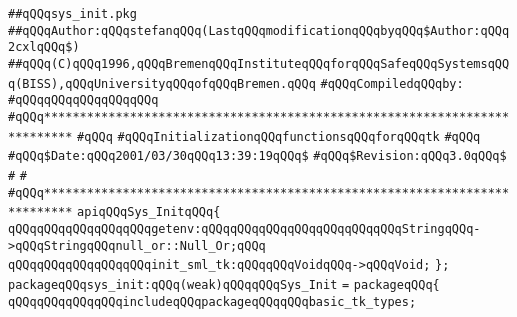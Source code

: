 \label{src/lib/tk/src/sys_init.pkg}
\verb|##qQQqsys_init.pkg|\newline
\verb|##qQQqAuthor:qQQqstefanqQQq(LastqQQqmodificationqQQqbyqQQq$Author:qQQq2cxlqQQq$)|\newline
\verb|##qQQq(C)qQQq1996,qQQqBremenqQQqInstituteqQQqforqQQqSafeqQQqSystemsqQQq(BISS),qQQqUniversityqQQqofqQQqBremen.qQQq|\newline
\newline
\verb|#qQQqCompiledqQQqby:|\newline
\verb|#qQQqqQQqqQQqqQQqqQQq|\newline
\newline
\newline
\verb|#qQQq**************************************************************************|\newline
\verb|#qQQq|\newline
\verb|#qQQqInitializationqQQqfunctionsqQQqforqQQqtk|\newline
\verb|#qQQq|\newline
\verb|#qQQq$Date:qQQq2001/03/30qQQq13:39:19qQQq$|\newline
\verb|#qQQq$Revision:qQQq3.0qQQq$|\newline
\verb|#|\newline
\verb|#|\newline
\verb|#qQQq**************************************************************************|\newline
\newline
\newline
\newline
\verb|apiqQQqSys_InitqQQq{|\newline
\newline
\verb|qQQqqQQqqQQqqQQqqQQqgetenv:qQQqqQQqqQQqqQQqqQQqqQQqqQQqStringqQQq->qQQqStringqQQqnull_or::Null_Or;qQQq|\newline
\verb|qQQqqQQqqQQqqQQqqQQqinit_sml_tk:qQQqqQQqVoidqQQq->qQQqVoid;|\newline
\verb|};|\newline
\newline
\newline
\verb|packageqQQqsys_init:qQQq(weak)qQQqqQQqSys_Init|\newline
\verb|=|\newline
\verb|packageqQQq{|\newline
\newline
\verb|qQQqqQQqqQQqqQQqincludeqQQqpackageqQQqqQQqbasic_tk_types;|\newline
